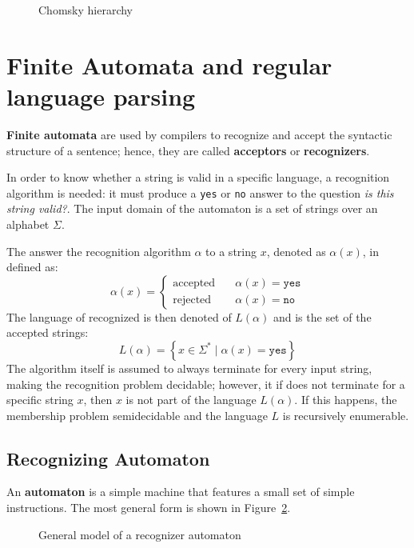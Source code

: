 \documentclass[english]{article}
\begin{document}
\begin{figure}[htbp]
  \bigskip
  \centering
  \caption{Chomsky hierarchy}
  \label{fig:chomsky-hierarchy}
  \bigskip
\end{figure}

\clearpage
\section{Finite Automata and regular language parsing}
\label{sec:finite-automata}

\textbf{Finite automata} are used by compilers to recognize and accept the syntactic structure of a sentence;
hence, they are called \textbf{acceptors} or \textbf{recognizers}.

In order to know whether a string is valid in a specific language, a recognition algorithm is needed: it must produce a \texttt{yes} or \texttt{no} answer to the question \textit{is this string valid?}.
The input domain of the automaton is a set of strings over an alphabet \(\Sigma\).

The answer the recognition algorithm \(\alpha\) to a string \(x\), denoted as \(\alpha(x)\), in defined as:
\[ \alpha(x) = \begin{cases}
    \text{accepted} \quad & \alpha(x) = \texttt{yes} \\
    \text{rejected} \quad & \alpha(x) = \texttt{no}
  \end{cases}\]
The language of recognized is then denoted of \(L(\alpha)\) and is the set of the accepted strings:
\[ L(\alpha) = \left\{ x \in \Sigma^\ast \mid \alpha(x) = \texttt{yes} \right\}\]
The algorithm itself is assumed to always terminate for every input string, making the recognition problem decidable;
however, it if does not terminate for a specific string \(x\), then \(x\) is not part of the language \(L(\alpha)\).
If this happens, the membership problem semidecidable and the language \(L\) is recursively enumerable.

\subsection{Recognizing Automaton}

An \textbf{automaton} is a simple machine that features a small set of simple instructions.
The most general form is shown in Figure~\ref{fig:automaton}.

\begin{figure}[hbtp]
  \centering
  \bigskip
  \caption{General model of a recognizer automaton}
  \label{fig:automaton}
  \bigskip
\end{figure}
\end{document}

